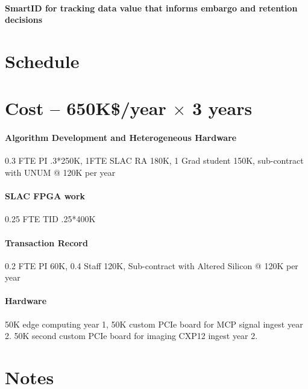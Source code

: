 \documentclass{article}
\begin{document}
\paragraph{SmartID for tracking data value that informs embargo and retention decisions}

\section{Schedule}

\section{Cost -- 650K\$/year $\times$ 3 years}
\paragraph{Algorithm Development and Heterogeneous Hardware} 0.3 FTE PI .3*250K, 1FTE SLAC RA 180K, 1 Grad student 150K, sub-contract with UNUM @ 120K per year
\paragraph{SLAC FPGA work} 0.25 FTE TID .25*400K
\paragraph{Transaction Record} 0.2 FTE PI 60K, 0.4 Staff 120K, Sub-contract with Altered Silicon @ 120K per year
\paragraph{Hardware} 50K edge computing year 1, 50K custom PCIe board for MCP signal ingest year 2.  50K second custom PCIe board for imaging CXP12 ingest year 2.











\pagebreak
\section{Notes}
\end{document}
